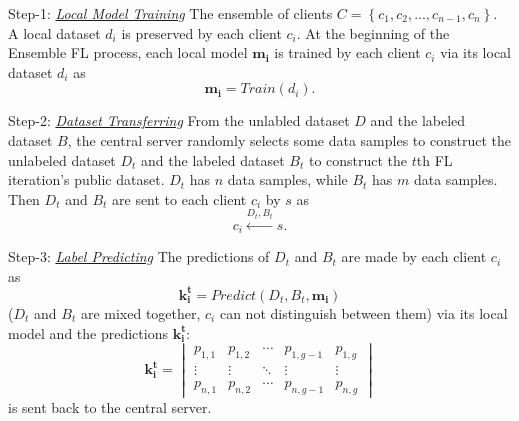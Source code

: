 \documentclass[journal]{IEEEtran}
\begin{document}
  \par Step-1: \ul{\textit{Local Model Training}} The ensemble of clients $C=\left \{ c_{1},c_{2},...,c_{n-1},c_{n} \right \}$. A local dataset $d_i$ is preserved by each client $c_i$. At the beginning of the Ensemble FL process, each local model $\mathbf{m_i}$ is trained by each client $c_i$ via its local dataset $d_i$ as
  \begin{equation}
    \mathbf{m_i}=Train(d_i).
  \end{equation}
  \par Step-2: \ul{\textit{Dataset Transferring}} From the unlabled dataset $D$ and the labeled dataset $B$, the central server randomly selects some data samples to construct the unlabeled dataset $D_t$ and the labeled dataset $B_t$ to construct the $t$th FL iteration's public dataset. $D_t$ has $n$ data samples, while $B_t$ has $m$ data samples. Then $D_t$ and $B_t$ are sent to each client $c_i$ by $s$ as
  \begin{equation}
    c_{i} \overset{{D_{t},B_{t}}}{\leftarrow}s.
  \end{equation}
  \par Step-3: \ul{\textit{Label Predicting}} The predictions of $D_t$ and $B_t$ are made by each client $c_i$ as
  \begin{equation}
    \mathbf{k_i^t}=Predict(D_t, B_t, \mathbf{m_i})
  \end{equation}
  ($D_t$ and $B_t$ are mixed together, $c_i$ can not distinguish between them) via its local model and the predictions $\mathbf{k_i^t}$:
  \begin{equation}
    \mathbf{k_i^t}=\begin{vmatrix}
      p_{1,1} & p_{1,2} & \cdots  & p_{1,g-1} & p_{1,g}\\ 
      \vdots  & \vdots & \ddots  & \vdots & \vdots\\ 
      p_{n,1} & p_{n,2} & \cdots  & p_{n,g-1} & p_{n,g}
      \end{vmatrix}
  \end{equation}
  is sent back to the central server.
\end{document}
